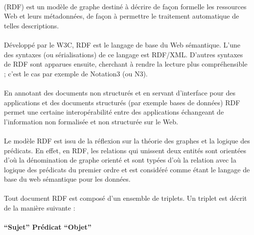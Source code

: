 \documentclass[12pt, a4paper, oneside]{book}
\begin{document}
\paragraph{}
(RDF) est un modèle de graphe destiné à décrire de façon formelle les ressources Web et leurs métadonnées, de façon à permettre le traitement automatique de telles descriptions. 
\paragraph{}
Développé par le W3C, RDF est le langage de base du Web sémantique. L'une des syntaxes (ou sérialisations) de ce langage est RDF/XML. D'autres syntaxes de RDF sont apparues ensuite, cherchant à rendre la lecture plus compréhensible ; c'est le cas par exemple de Notation3 (ou N3).
\paragraph{}
En annotant des documents non structurés et en servant d'interface pour des applications et des documents structurés (par exemple bases de données) RDF permet une certaine interopérabilité entre des applications échangeant de l'information non formalisée et non structurée sur le Web.
\paragraph{}
Le modèle RDF est issu de la réflexion sur la théorie des graphes et la logique des prédicats. 
En effet, en RDF, les relations qui unissent deux entités sont orientées d'où la dénomination de graphe orienté et sont typées d'où la relation avec la logique des prédicats du premier ordre et est considéré comme étant le langage de base du web sémantique pour les données. 
\paragraph{}
Tout document RDF est composé d'un ensemble de triplets. Un triplet est décrit de la manière suivante :
\paragraph{}
\textbf{“Sujet” Prédicat “Objet”}
\paragraph{}
\end{document}
